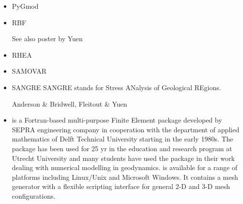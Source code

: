 \begin{itemize}
\item PyGmod 

{\small
\noindent
\textcite{crvs15}
}

\item {\codefont RBF} 

\textcite{arfw14}

See also poster by Yuen

\item RHEA 

{\scriptsize
\noindent
\textcite{bugg08}
\textcite{stgb10}
\textcite{algs12}
\textcite{busa13}
}

\item SAMOVAR

{\scriptsize
\noindent
\textcite{elga10}
}


\item {\codefont SANGRE} 
SANGRE stands for Stress ANalysis of Geological REgions.

\begin{scriptsize}
Anderson \& Bridwell\cite{anbr80},
Fleitout \& Yuen \cite{flyu84,flyu84b}
\end{scriptsize}

\item \sepran 
{}

\sepran \cite{sepr05} is a Fortran-based
multi-purpose Finite Element package developed by SEPRA engineering company in
cooperation with the department of applied mathematics of Delft Technical University
starting in the early 1980s. The package has been used for 25 yr in the education and
research program at Utrecht University and many students have used the package in
their work dealing with numerical modelling in geodynamics. \sepran is available for
a range of platforms including Linux/Unix and Microsoft Windows. It contains a mesh
generator with a flexible scripting interface for general 2-D and 3-D mesh configurations.


\end{itemize}

